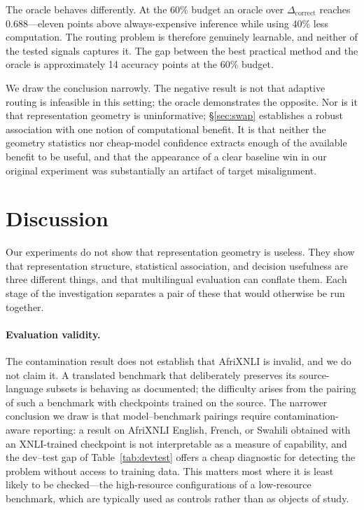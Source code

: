 \documentclass[11pt]{article}
\newcommand{\claim}[1]{#1}   %
\begin{document}
The oracle behaves differently. At the 60\% budget an oracle over
$\Delta_{\mathrm{correct}}$ reaches $0.688$---eleven points above
always-expensive inference while using 40\% less computation.
\claim{The routing problem is therefore genuinely learnable, and neither of the
tested signals captures it.} The gap between the best practical method and the
oracle is approximately 14 accuracy points at the 60\% budget.

We draw the conclusion narrowly. The negative result is not that adaptive routing
is infeasible in this setting; the oracle demonstrates the opposite. Nor is it
that representation geometry is uninformative; \S\ref{sec:swap} establishes a
robust association with one notion of computational benefit. It is that neither
the geometry statistics nor cheap-model confidence extracts enough of the
available benefit to be useful, and that the appearance of a clear baseline win
in our original experiment was substantially an artifact of target misalignment.

\section{Discussion}
\label{sec:discussion}

\claim{Our experiments do not show that representation geometry is useless. They
show that representation structure, statistical association, and decision
usefulness are three different things, and that multilingual evaluation can
conflate them.} Each stage of the investigation separates a pair of these that
would otherwise be run together.

\paragraph{Evaluation validity.} The contamination result does not establish that
AfriXNLI is invalid, and we do not claim it. A translated benchmark that
deliberately preserves its source-language subsets is behaving as documented; the
difficulty arises from the pairing of such a benchmark with checkpoints trained on
the source. The narrower conclusion we draw is that
\claim{model--benchmark pairings require contamination-aware reporting}: a result
on AfriXNLI English, French, or Swahili obtained with an XNLI-trained checkpoint
is not interpretable as a measure of capability, and the dev--test gap of
Table~\ref{tab:devtest} offers a cheap diagnostic for detecting the problem
without access to training data. This matters most where it is least likely to be
checked---the high-resource configurations of a low-resource benchmark, which are
typically used as controls rather than as objects of study.
\end{document}
